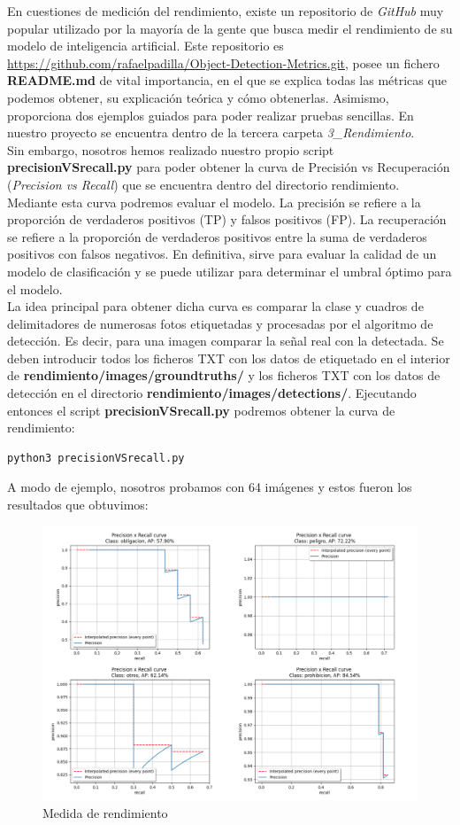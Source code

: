 En cuestiones de medición del rendimiento, existe un repositorio de \textit{GitHub} muy popular utilizado por la mayoría de la gente que busca medir el rendimiento de su modelo de inteligencia artificial. Este repositorio es \url{https://github.com/rafaelpadilla/Object-Detection-Metrics.git}, posee un fichero \textbf{README.md} de vital importancia, en el que se explica todas las métricas que podemos obtener, su explicación teórica y cómo obtenerlas. Asimismo, proporciona dos ejemplos guiados para poder realizar pruebas sencillas. En nuestro proyecto se encuentra dentro de la tercera carpeta \textit{3_Rendimiento}.\\

Sin embargo, nosotros hemos realizado nuestro propio script \textbf{precisionVSrecall.py} para poder obtener la curva de Precisión vs Recuperación (\textit{Precision vs Recall}) que se encuentra dentro del directorio rendimiento. Mediante esta curva podremos evaluar el modelo. La precisión se refiere a la proporción de verdaderos positivos (TP) y falsos positivos (FP). La recuperación se refiere a la proporción de verdaderos positivos entre la suma de verdaderos positivos con falsos negativos. En definitiva, sirve para evaluar la calidad de un modelo de clasificación y se puede utilizar para determinar el umbral óptimo para el modelo.\\

La idea principal para obtener dicha curva es comparar la clase y cuadros de delimitadores de numerosas fotos etiquetadas y procesadas por el algoritmo de detección. Es decir, para una imagen comparar la señal real con la detectada. Se deben introducir todos los ficheros TXT con los datos de etiquetado en el interior de \textbf{rendimiento/images/groundtruths/} y los ficheros TXT con los datos de detección en el directorio \textbf{rendimiento/images/detections/}. Ejecutando entonces el script \textbf{precisionVSrecall.py} podremos obtener la curva de rendimiento:
\begin{lstlisting}
python3 precisionVSrecall.py
\end{lstlisting}

A modo de ejemplo, nosotros probamos con 64 imágenes y estos fueron los resultados que obtuvimos:

\begin{figure}[H]
	\centering
	\includegraphics[width=\textwidth]{Imagenes/AnexoI_Manual/AA/rendimiento.pdf}
	\caption{Medida de rendimiento}
	\label{rendimiento}
\end{figure}


